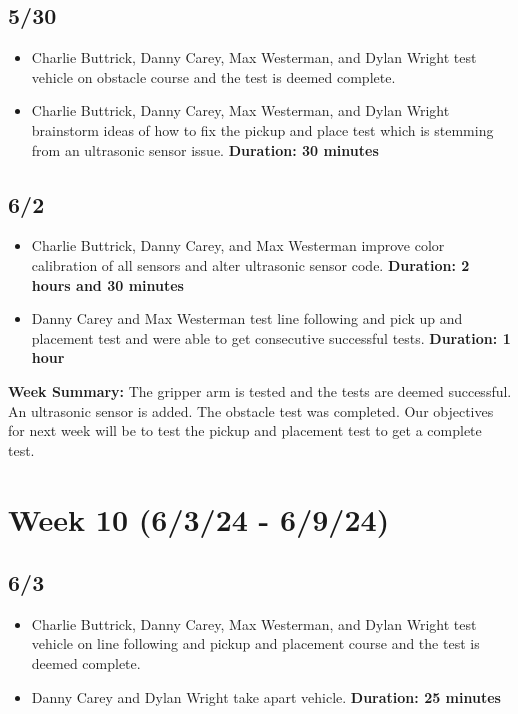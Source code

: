 \documentclass[11pt]{report}
\begin{document}
\subsection*{5/30}

\begin{itemize}
    \item Charlie Buttrick, Danny Carey, Max Westerman, and Dylan Wright test vehicle on obstacle course and the test is deemed complete.
    \item Charlie Buttrick, Danny Carey, Max Westerman, and Dylan Wright brainstorm ideas of how to fix the pickup and place test which is stemming from an ultrasonic sensor issue. \textbf{Duration: 30 minutes}
\end{itemize}

\subsection*{6/2}

\begin{itemize}
    \item Charlie Buttrick, Danny Carey, and Max Westerman improve color calibration of all sensors and alter ultrasonic sensor code. \textbf{Duration: 2 hours and 30 minutes}
    \item Danny Carey and Max Westerman test line following and pick up and placement test and were able to get consecutive successful tests. \textbf{Duration: 1 hour}
\end{itemize}

\textbf{Week Summary:} The gripper arm is tested and the tests are deemed successful. An ultrasonic sensor is added. The obstacle test was completed. Our objectives for next week will be to test the pickup and placement test to get a complete test.

\section{Week 10 (6/3/24 - 6/9/24)}
\subsection*{6/3}

\begin{itemize}
    \item Charlie Buttrick, Danny Carey, Max Westerman, and Dylan Wright test vehicle on line following and pickup and placement course and the test is deemed complete.
    \item Danny Carey and Dylan Wright take apart vehicle. \textbf{Duration: 25 minutes}
\end{itemize}


\SectionuseNormalSectionSizing
\SubSectionuseNormalSectionSizing
\end{document}
